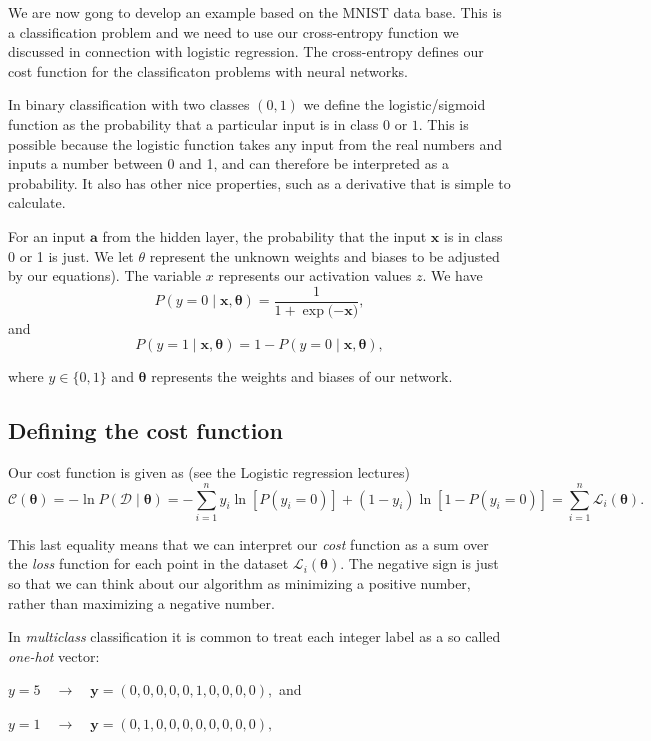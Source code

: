 \documentclass[%
oneside,                 %
final,                   %
10pt]{article}
\begin{document}
We are now gong to develop an example based on the MNIST data
base. This is a classification problem and we need to use our
cross-entropy function we discussed in connection with logistic
regression. The cross-entropy defines our cost function for the
classificaton problems with neural networks.

In binary classification with two classes $(0, 1)$ we define the
logistic/sigmoid function as the probability that a particular input
is in class $0$ or $1$.  This is possible because the logistic
function takes any input from the real numbers and inputs a number
between 0 and 1, and can therefore be interpreted as a probability. It
also has other nice properties, such as a derivative that is simple to
calculate.

For an input $\boldsymbol{a}$ from the hidden layer, the probability that the input $\boldsymbol{x}$
is in class 0 or 1 is just. We let $\theta$ represent the unknown weights and biases to be adjusted by our equations). The variable $x$
represents our activation values $z$. We have
\[
P(y = 0 \mid \bm{x}, \bm{\theta}) = \frac{1}{1 + \exp{(- \bm{x}})} ,
\]
and
\[
P(y = 1 \mid \bm{x}, \bm{\theta}) = 1 - P(y = 0 \mid \bm{x}, \bm{\theta}) ,
\]

where $y \in \{0, 1\}$  and $\bm{\theta}$ represents the weights and biases
of our network.


\subsection{Defining the cost function}

Our cost function is given as (see the Logistic regression lectures)
\[
\mathcal{C}(\bm{\theta}) = - \ln P(\mathcal{D} \mid \bm{\theta}) = - \sum_{i=1}^n
y_i \ln[P(y_i = 0)] + (1 - y_i) \ln [1 - P(y_i = 0)] = \sum_{i=1}^n \mathcal{L}_i(\bm{\theta}) .
\]

This last equality means that we can interpret our \emph{cost} function as a sum over the \emph{loss} function
for each point in the dataset $\mathcal{L}_i(\bm{\theta})$.  
The negative sign is just so that we can think about our algorithm as minimizing a positive number, rather
than maximizing a negative number.  

In \emph{multiclass} classification it is common to treat each integer label as a so called \emph{one-hot} vector:  

$y = 5 \quad \rightarrow \quad \bm{y} = (0, 0, 0, 0, 0, 1, 0, 0, 0, 0) ,$ and

$y = 1 \quad \rightarrow \quad \bm{y} = (0, 1, 0, 0, 0, 0, 0, 0, 0, 0) ,$ 
\end{document}
